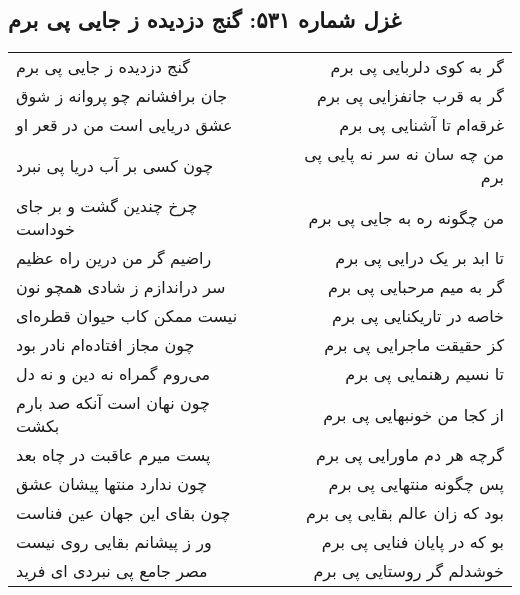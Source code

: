 \begin{center}
\section*{غزل شماره ۵۳۱: گنج دزدیده ز جایی پی برم}
\label{sec:531}
\begin{longtable}{l p{0.5cm} r}
گنج دزدیده ز جایی پی برم
&&
گر به کوی دلربایی پی برم
\\
جان برافشانم چو پروانه ز شوق
&&
گر به قرب جانفزایی پی برم
\\
عشق دریایی است من در قعر او
&&
غرقه‌ام تا آشنایی پی برم
\\
چون کسی بر آب دریا پی نبرد
&&
من چه سان نه سر نه پایی پی برم
\\
چرخ چندین گشت و بر جای خوداست
&&
من چگونه ره به جایی پی برم
\\
راضیم گر من درین راه عظیم
&&
تا ابد بر یک درایی پی برم
\\
سر دراندازم ز شادی همچو نون
&&
گر به میم مرحبایی پی برم
\\
نیست ممکن کاب حیوان قطره‌ای
&&
خاصه در تاریکنایی پی برم
\\
چون مجاز افتاده‌ام نادر بود
&&
کز حقیقت ماجرایی پی برم
\\
می‌روم گمراه نه دین و نه دل
&&
تا نسیم رهنمایی پی برم
\\
چون نهان است آنکه صد بارم بکشت
&&
از کجا من خونبهایی پی برم
\\
پست میرم عاقبت در چاه بعد
&&
گرچه هر دم ماورایی پی برم
\\
چون ندارد منتها پیشان عشق
&&
پس چگونه منتهایی پی برم
\\
چون بقای این جهان عین فناست
&&
بود که زان عالم بقایی پی برم
\\
ور ز پیشانم بقایی روی نیست
&&
بو که در پایان فنایی پی برم
\\
مصر جامع پی نبردی ای فرید
&&
خوشدلم گر روستایی پی برم
\\
\end{longtable}
\end{center}
